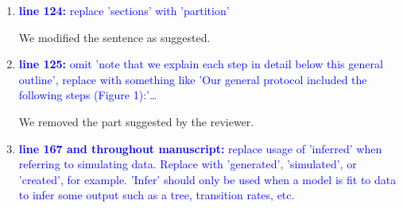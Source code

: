 \documentclass[12pt,letterpaper]{article}
\begin{document}
\begin{enumerate}
(2) - the second point underlined by the reviewer in this specific comment strikes use as really interesting.
We ran this additional analysis by comparing the estimated $\alpha$ parameter for the morphological rates distribution to the ``true'' $\alpha$ parameter.
We found results that the $\alpha$ parameter is usually slightly underestimated for the various ``missing-data'' trees unless the number of living species with no morphological data is high ($M_L$ = 75\%), then, the $\alpha$ are overestimated.
These results are somewhat in agreement with our topological differences results: the number of living species seems to be a driving missing data parameter for inferring Total Evidence trees.
Nonetheless, we considered this study to already be long and complex.
We therefore think that adding an extra question to this study (i.e. what is the effect of missing data on the morphological substitution rate parameter estimates?) might lose the reader and make an already long paper even longer.
Therefore, we added the results of these analyses to \textbf{Appendix-A Morphological rates estimations results}.
We link to this analysis in the methods as follows:

"The detailed MrBayes parameters are available in Appendix A along with details on the $\alpha$ parameter estimation." lines 336-338 @@@
See also Appendix A "Morphological rates estimations results".


\item{\textcolor{blue}{\textbf{line 124:} replace 'sections' with 'partition'}}

We modified the sentence as suggested. 


\item{\textcolor{blue}{\textbf{line 125:} omit 'note that we explain each step in detail below this general outline', replace with something like 'Our general protocol included the following steps (Figure 1):'…}}

We removed the part suggested by the reviewer.

\item{\textcolor{blue}{\textbf{line 167 and throughout manuscript:} replace usage of 'inferred' when referring to simulating data. Replace with 'generated', 'simulated', or 'created', for example. 'Infer' should only be used when a model is fit to data to infer some output such as a tree, transition rates, etc. }}


\end{enumerate}
\end{document}
